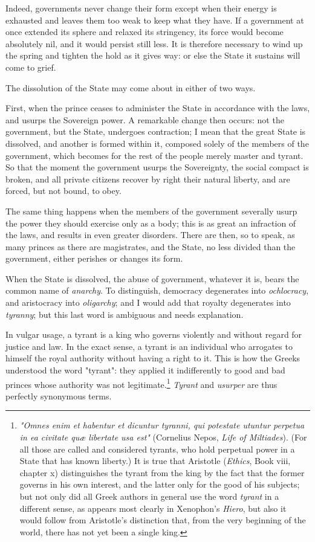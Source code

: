 \documentclass[12pt]{book}
\begin{document}
Indeed, governments never change their form except when their energy is exhausted and leaves them too weak to keep what they have. If a government at once extended its sphere and relaxed its stringency, its force would become absolutely nil, and it would persist still less. It is therefore necessary to wind up the spring and tighten the hold as it gives way: or else the State it sustains will come to grief.

The dissolution of the State may come about in either of two ways.

First, when the prince ceases to administer the State in accordance with the laws, and usurps the Sovereign power. A remarkable change then occurs: not the government, but the State, undergoes contraction; I mean that the great State is dissolved, and another is formed within it, composed solely of the members of the government, which becomes for the rest of the people merely master and tyrant. So that the moment the government usurps the Sovereignty, the social compact is broken, and all private citizens recover by right their natural liberty, and are forced, but not bound, to obey.

The same thing happens when the members of the government severally usurp the power they should exercise only as a body; this is as great an infraction of the laws, and results in even greater disorders. There are then, so to speak, as many princes as there are magistrates, and the State, no less divided than the government, either perishes or changes its form.

When the State is dissolved, the abuse of government, whatever it is, bears the common name of \textit{anarchy}. To distinguish, democracy degenerates into \textit{ochlocracy}, and aristocracy into \textit{oligarchy}; and I would add that royalty degenerates into \textit{tyranny}; but this last word is ambiguous and needs explanation.

In vulgar usage, a tyrant is a king who governs violently and without regard for justice and law. In the exact sense, a tyrant is an individual who arrogates to himself the royal authority without having a right to it. This is how the Greeks understood the word "tyrant": they applied it indifferently to good and bad princes whose authority was not legitimate.\footnote{\textit{"Omnes enim et habentur et dicuntur tyranni, qui potestate utuntur perpetua in ea civitate quæ libertate usa est"} (Cornelius Nepos, \textit{Life of Miltiades}). (For all those are called and considered tyrants, who hold perpetual power in a State that has known liberty.) It is true that Aristotle (\textit{Ethics}, Book viii, chapter x) distinguishes the tyrant from the king by the fact that the former governs in his own interest, and the latter only for the good of his subjects; but not only did all Greek authors in general use the word \textit{tyrant} in a different sense, as appears most clearly in Xenophon's \textit{Hiero}, but also it would follow from Aristotle's distinction that, from the very beginning of the world, there has not yet been a single king.} \textit{Tyrant} and \textit{usurper} are thus perfectly synonymous terms.
\end{document}
